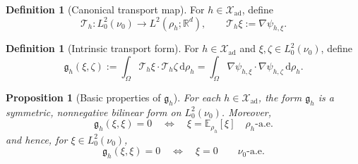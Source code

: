 \documentclass{article}
\newtheorem{proposition}[theorem]{Proposition}
\theoremstyle{definition}
\newtheorem{definition}[theorem]{Definition}
\renewcommand{\d}{\mathrm{d}}
\begin{document}
\begin{definition}[Canonical transport map]
    \label{def:ambient-transport-map}
    For \(h\in\mathcal X_{\mathrm{ad}}\), define
    \[
        \mathcal T_h : L^2_0(\nu_0)\to L^2(\rho_h;\mathbb R^d),
        \qquad
        \mathcal T_h\xi := \nabla\psi_{h,\xi}.
    \]
\end{definition}

\begin{definition}[Intrinsic transport form]
    \label{def:intrinsic-transport-form}
    For \(h\in\mathcal X_{\mathrm{ad}}\) and \(\xi,\zeta\in L^2_0(\nu_0)\), define
    \begin{equation}
        \label{eq:intrinsic-transport-form}
        \mathfrak g_h(\xi,\zeta)
        :=
        \int_\Omega \mathcal T_h\xi\cdot \mathcal T_h\zeta\,\d\rho_h
        =
        \int_\Omega \nabla\psi_{h,\xi}\cdot\nabla\psi_{h,\zeta}\,\d\rho_h.
    \end{equation}
\end{definition}

\begin{proposition}[Basic properties of \texorpdfstring{$\mathfrak g_h$}{g\_h}]
    \label{prop:ambient-transport-form-properties}
    For each \(h\in\mathcal X_{\mathrm{ad}}\), the form \(\mathfrak g_h\) is a symmetric,
    nonnegative bilinear form on \(L^2_0(\nu_0)\). Moreover,
    \[
        \mathfrak g_h(\xi,\xi)=0
        \quad\Longleftrightarrow\quad
        \xi=\mathbb E_{\rho_h}[\xi]
        \quad \rho_h\text{-a.e.}
    \]
    and hence, for \(\xi\in L^2_0(\nu_0)\),
    \[
        \mathfrak g_h(\xi,\xi)=0
        \quad\Longleftrightarrow\quad
        \xi=0
        \qquad \nu_0\text{-a.e.}
    \]
\end{proposition}
\end{document}
